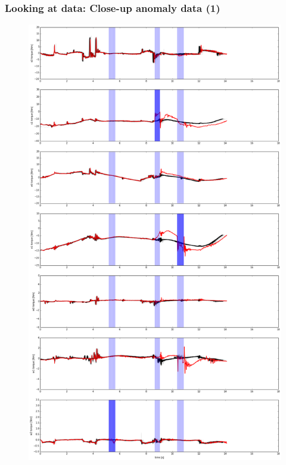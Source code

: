 \documentclass[%
USenglish,%
pdftex,%
compress,%
10pt,%
svgnames%
,handout
]
{beamer}
\begin{document}
\begin{frame}
    \frametitle{Looking at data: Close-up anomaly data (1)}
    \begin{figure}
        \centering
        \includegraphics[width=\datawidth]{figs/anomaly12.png}
    \end{figure}
\end{frame}
\end{document}
